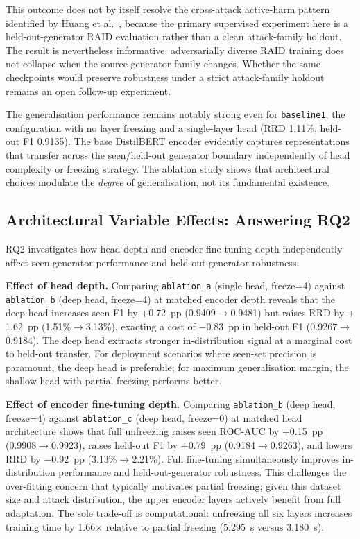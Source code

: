 \documentclass[conference]{IEEEtran}
\begin{document}
This outcome does not by itself resolve the cross-attack active-harm pattern
identified by Huang et al.~\cite{huang2024}, because the primary supervised
experiment here is a held-out-generator RAID evaluation rather than a clean
attack-family holdout. The result is nevertheless informative: adversarially
diverse RAID training does not collapse when the source generator family
changes. Whether the same checkpoints would preserve robustness under a
strict attack-family holdout remains an open follow-up experiment.

The generalisation performance remains notably strong even for
\texttt{baseline1}, the configuration with no layer freezing and a single-layer
head (RRD 1.11\%, held-out F1 0.9135). The base DistilBERT encoder evidently
captures representations that transfer across the seen/held-out generator
boundary independently of head complexity or freezing strategy. The ablation
study shows that architectural choices modulate the \emph{degree} of
generalisation, not its fundamental existence.

\subsection{Architectural Variable Effects: Answering RQ2}\label{ssec:rq2}

RQ2 investigates how head depth and encoder fine-tuning depth independently
affect seen-generator performance and held-out-generator robustness.

\textbf{Effect of head depth.} Comparing \texttt{ablation\_a} (single head,
freeze=4) against \texttt{ablation\_b} (deep head, freeze=4) at matched encoder
depth reveals that the deep head increases seen F1 by $+$0.72~pp
(0.9409$\rightarrow$0.9481) but raises RRD by $+$1.62~pp (1.51\%$\rightarrow$3.13\%),
exacting a cost of $-$0.83~pp in held-out F1 (0.9267$\rightarrow$0.9184). The deep
head extracts stronger in-distribution signal at a marginal cost to held-out
transfer. For deployment scenarios where seen-set precision is paramount, the
deep head is preferable; for maximum generalisation margin, the shallow head
with partial freezing performs better.

\textbf{Effect of encoder fine-tuning depth.} Comparing \texttt{ablation\_b}
(deep head, freeze=4) against \texttt{ablation\_c} (deep head, freeze=0) at
matched head architecture shows that full unfreezing raises seen ROC-AUC
by $+$0.15~pp (0.9908$\rightarrow$0.9923), raises held-out F1 by $+$0.79~pp
(0.9184$\rightarrow$0.9263), and lowers RRD by $-$0.92~pp (3.13\%$\rightarrow$2.21\%).
Full fine-tuning simultaneously improves in-distribution performance and
held-out-generator robustness. This challenges the over-fitting concern that
typically motivates partial freezing; given this dataset size and attack
distribution, the upper encoder layers actively benefit from full adaptation. The
sole trade-off is computational: unfreezing all six layers increases training
time by 1.66$\times$ relative to partial freezing (5,295~s versus 3,180~s).
\end{document}
